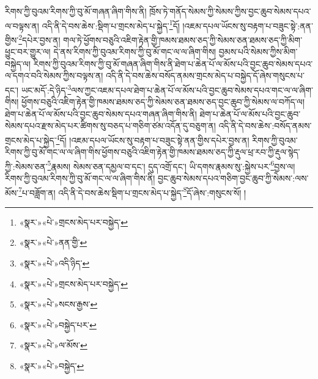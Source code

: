 རིགས་ཀྱི་བུའམ་རིགས་ཀྱི་བུ་མོ་གཞན་ཞིག་གིས་ནི། ཁྲོས་ཏེ་གནོད་སེམས་ཀྱི་སེམས་ཀྱིས་བྱང་ཆུབ་སེམས་དཔའ་ལ་བལྟས་ན། འདི་ནི་དེ་བས་ཆེས་:སྡིག་པ་གྲངས་མེད་པ་སྐྱེད་\footnote{«སྣར་»«པེ་»གྲངས་མེད་པར་བསྐྱེད་}དོ། །འཇམ་དཔལ་ཡོངས་སུ་བརྟག་པ་བཟུང་སྟེ་:ནན་གྱིས་\footnote{«སྣར་»«པེ་»ནན་གྱི་}དཔེར་བྱས་ན། གལ་ཏེ་ཕྱོགས་བཅུའི་འཇིག་རྟེན་གྱི་ཁམས་ཐམས་ཅད་ཀྱི་སེམས་ཅན་ཐམས་ཅད་ཀྱི་མིག་ཕྱུང་བར་གྱུར་ལ། དེ་ནས་རིགས་ཀྱི་བུའམ་རིགས་ཀྱི་བུ་མོ་གང་ལ་ལ་ཞིག་གིས། བྱམས་པའི་སེམས་ཀྱིས་མིག་བསྐྱེད་ལ། རིགས་ཀྱི་བུའམ་རིགས་ཀྱི་བུ་མོ་གཞན་ཞིག་གིས་ནི་ཐེག་པ་ཆེན་པོ་ལ་མོས་པའི་བྱང་ཆུབ་སེམས་དཔའ་ལ་དགའ་བའི་སེམས་ཀྱིས་བལྟས་ན། འདི་ནི་དེ་བས་ཆེས་བསོད་ནམས་གྲངས་མེད་པ་བསྐྱེད་དོ་ཞེས་གསུངས་པ་དང་། ཡང་མདོ་:དེ་ཉིད་\footnote{«སྣར་»«པེ་»འདི་ཉིད་}ལས་ཀྱང་འཇམ་དཔལ་ཐེག་པ་ཆེན་པོ་ལ་མོས་པའི་བྱང་ཆུབ་སེམས་དཔའ་གང་ལ་ལ་ཞིག་གིས། ཕྱོགས་བཅུའི་འཇིག་རྟེན་གྱི་ཁམས་ཐམས་ཅད་ཀྱི་སེམས་ཅན་ཐམས་ཅད་བྱང་ཆུབ་ཀྱི་སེམས་ལ་བཀོད་ལ། ཐེག་པ་ཆེན་པོ་ལ་མོས་པའི་བྱང་ཆུབ་སེམས་དཔའ་གཞན་ཞིག་གིས་ནི། ཐེག་པ་ཆེན་པོ་ལ་མོས་པའི་བྱང་ཆུབ་སེམས་དཔའ་རྫས་མེད་པར་ཚིགས་སུ་བཅད་པ་གཅིག་ཙམ་འདོན་དུ་བཅུག་ན། འདི་ནི་དེ་བས་ཆེས་:བསོད་ནམས་གྲངས་མེད་པ་སྐྱེད་\footnote{«སྣར་»«པེ་»གྲངས་མེད་པར་བསྐྱེད་}དོ། །འཇམ་དཔལ་ཡོངས་སུ་བརྟག་པ་བཟུང་སྟེ་ནན་གྱིས་དཔེར་བྱས་ན། རིགས་ཀྱི་བུའམ་རིགས་ཀྱི་བུ་མོ་གང་ལ་ལ་ཞིག་གིས་ཕྱོགས་བཅུའི་འཇིག་རྟེན་གྱི་ཁམས་ཐམས་ཅད་ཀྱི་རྡུལ་ཕྲ་རབ་ཀྱི་རྡུལ་སྙེད་ཀྱི་:སེམས་ཅན་\footnote{«སྣར་»«པེ་»སངས་རྒྱས་}རྣམས། སེམས་ཅན་དམྱལ་བ་དང་། དུད་འགྲོ་དང་། ཡི་དགས་རྣམས་སུ་:སྐྱེས་པར་\footnote{«སྣར་»«པེ་»བསྐྱེད་པར་}བྱས་ལ། རིགས་ཀྱི་བུའམ་རིགས་ཀྱི་བུ་མོ་གང་ལ་ལ་ཞིག་གིས་ནི། བྱང་ཆུབ་སེམས་དཔའ་གཅིག་བྱང་ཆུབ་ཀྱི་སེམས་:ལས་མོས་\footnote{«སྣར་»«པེ་»ལ་མོས་}པ་བཟློག་ན། འདི་ནི་དེ་བས་ཆེས་སྡིག་པ་གྲངས་མེད་པ་སྐྱེད་\footnote{«སྣར་»«པེ་»བསྐྱེད་}དོ་ཞེས་:གསུངས་སོ། །
